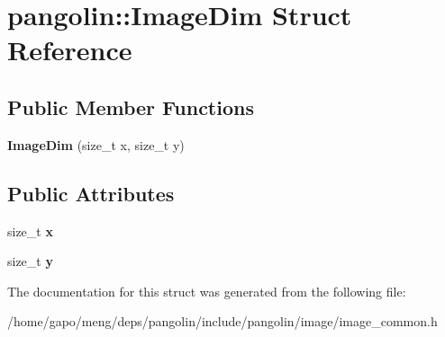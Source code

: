 \hypertarget{structpangolin_1_1_image_dim}{}\section{pangolin\+:\+:Image\+Dim Struct Reference}
\label{structpangolin_1_1_image_dim}
\subsection*{Public Member Functions}
\begin{DoxyCompactItemize}
\item 
{\bfseries Image\+Dim} (size\+\_\+t x, size\+\_\+t y)\hypertarget{structpangolin_1_1_image_dim_ac8b2e1948e217fc2474cc7b7e21009d4}{}\label{structpangolin_1_1_image_dim_ac8b2e1948e217fc2474cc7b7e21009d4}

\end{DoxyCompactItemize}
\subsection*{Public Attributes}
\begin{DoxyCompactItemize}
\item 
size\+\_\+t {\bfseries x}\hypertarget{structpangolin_1_1_image_dim_a5ca02ca0d0999cf41ccb293e54997291}{}\label{structpangolin_1_1_image_dim_a5ca02ca0d0999cf41ccb293e54997291}

\item 
size\+\_\+t {\bfseries y}\hypertarget{structpangolin_1_1_image_dim_a0685f384eb29c0732621506520186752}{}\label{structpangolin_1_1_image_dim_a0685f384eb29c0732621506520186752}

\end{DoxyCompactItemize}


The documentation for this struct was generated from the following file\+:\begin{DoxyCompactItemize}
\item 
/home/gapo/meng/deps/pangolin/include/pangolin/image/image\+\_\+common.\+h\end{DoxyCompactItemize}
